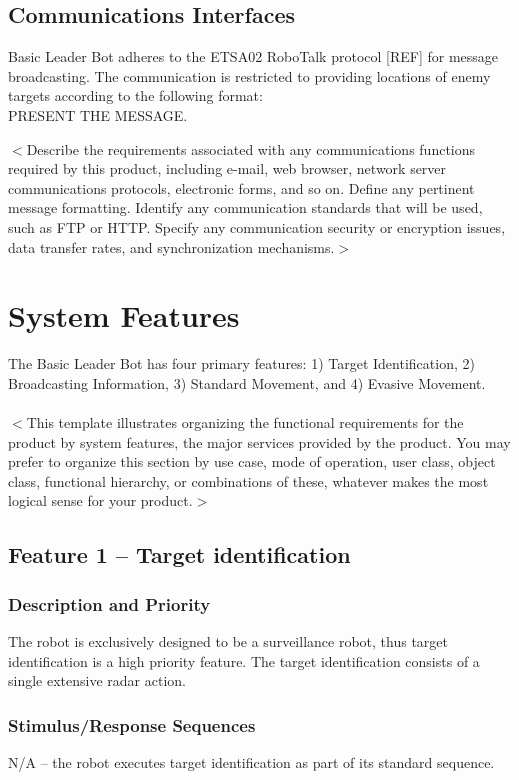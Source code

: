 \documentclass{scrreprt}
\begin{document}
\section{Communications Interfaces}
Basic Leader Bot adheres to the ETSA02 RoboTalk protocol [REF] for message broadcasting. The communication is restricted to providing locations of enemy targets according to the following format:\\

PRESENT THE MESSAGE.

$<$Describe the requirements associated with any communications functions 
required by this product, including e-mail, web browser, network server 
communications protocols, electronic forms, and so on. Define any pertinent 
message formatting. Identify any communication standards that will be used, such 
as FTP or HTTP. Specify any communication security or encryption issues, data 
transfer rates, and synchronization mechanisms.$>$


\chapter{System Features}
The Basic Leader Bot has four primary features: 1) Target Identification, 2) Broadcasting Information, 3) Standard Movement, and 4) Evasive Movement.\\\\
$<$This template illustrates organizing the functional requirements for the 
product by system features, the major services provided by the product. You may 
prefer to organize this section by use case, mode of operation, user class, 
object class, functional hierarchy, or combinations of these, whatever makes the 
most logical sense for your product.$>$

\section{Feature 1 -- Target identification}

\subsection{Description and Priority}
The robot is exclusively designed to be a surveillance robot, thus target identification is a high priority feature. The target identification consists of a single extensive radar action.

\subsection{Stimulus/Response Sequences}
N/A -- the robot executes target identification as part of its standard sequence.
\end{document}
